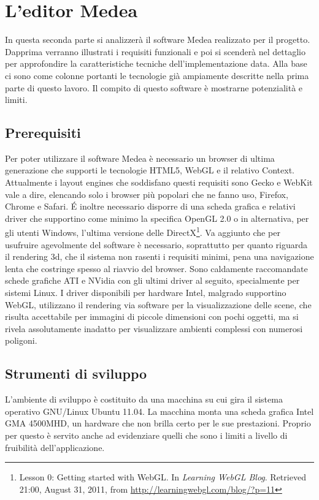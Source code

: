\chapter{L'editor Medea}                 

In questa seconda parte si analizzerà il software Medea realizzato per il progetto. Dapprima verranno illustrati i requisiti funzionali e poi si scenderà nel dettaglio per approfondire la caratteristiche tecniche dell'implementazione data. Alla base ci sono come colonne portanti le tecnologie già ampiamente descritte nella prima parte di questo lavoro. Il compito di questo software è mostrarne potenzialità e limiti.


\section{Prerequisiti}
Per poter utilizzare il software Medea è necessario un browser di ultima generazione che supporti le tecnologie HTML5, WebGL e il relativo Context. Attualmente i layout engines che soddisfano questi requisiti sono Gecko e WebKit vale a dire, elencando solo i browser più popolari che ne fanno uso, Firefox, Chrome e Safari. 
\'{E} inoltre necessario disporre di una scheda grafica e relativi driver che supportino come minimo la specifica OpenGL 2.0 o in alternativa, per gli utenti Windows, l'ultima versione delle DirectX\footnote{Lesson 0: Getting started with WebGL. In \textit{Learning WebGL Blog}. Retrieved 21:00, August 31, 2011, from \url{http://learningwebgl.com/blog/?p=11}}. Va aggiunto che per usufruire agevolmente del software è necessario, soprattutto per quanto riguarda il rendering 3d, che il sistema non rasenti i requisiti minimi, pena una navigazione lenta che costringe spesso al riavvio del browser. Sono caldamente raccomandate schede grafiche ATI e NVidia con gli ultimi driver al seguito, specialmente per sistemi Linux. I driver disponibili per hardware Intel, malgrado supportino WebGL, utilizzano il rendering via software per la visualizzazione delle scene, che risulta accettabile per immagini di piccole dimensioni con pochi oggetti, ma si rivela assolutamente inadatto per visualizzare ambienti complessi con numerosi poligoni.


\section{Strumenti di sviluppo}
L'ambiente di sviluppo è costituito da una macchina su cui gira il sistema operativo GNU/Linux Ubuntu 11.04. La macchina monta una scheda grafica Intel GMA 4500MHD, un hardware che non brilla certo per le sue prestazioni. Proprio per questo è servito anche ad evidenziare quelli che sono i limiti a livello di fruibilità dell'applicazione.

